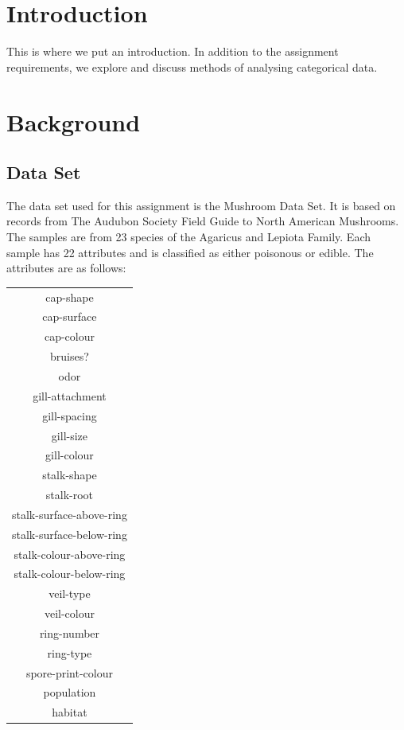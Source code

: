 \documentclass[12pt]{book}
\begin{document}

\tableofcontents
\pagebreak

\chapter{Introduction}
This is where we put an introduction.
In addition to the assignment requirements, we explore and discuss methods of analysing categorical data.

\chapter{Background}
\section{Data Set}
The data set used for this assignment is the Mushroom Data Set.\cite{dataset}
It is based on records from The Audubon Society Field Guide to North American Mushrooms.
The samples are from 23 species of the Agaricus and Lepiota Family.
Each sample has 22 attributes and is classified as either poisonous or edible.
The attributes are as follows:
\begin{center}
\begin{tabular}{ |c| }
 \hline
 cap-shape \\ cap-surface \\ cap-colour \\ bruises? \\ odor \\ gill-attachment \\ gill-spacing \\ gill-size \\ gill-colour \\ stalk-shape \\ stalk-root \\ stalk-surface-above-ring \\ stalk-surface-below-ring \\ stalk-colour-above-ring \\ stalk-colour-below-ring \\ veil-type \\ veil-colour \\ ring-number \\ ring-type \\ spore-print-colour \\ population \\ habitat \\
\hline
\end{tabular}
\end{center}
\end{document}
